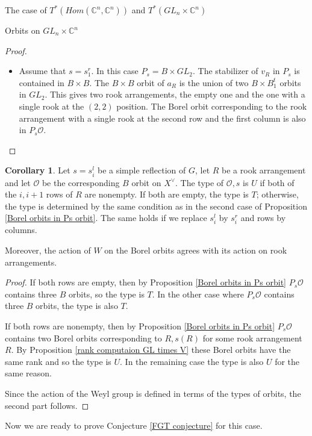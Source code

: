 \documentclass[12pt]{article}
\newcommand{\C}{\mathbb{C}}
\newcommand{\s}{\mathcal{O}}
\theoremstyle{plain}
\theoremstyle{definition}
\newtheorem{cor}[theorem]{Corollary}
\begin{document}
\begin{subsection}{The case of $T^*(Hom(\C^n,\C^n))$ and $T^*(GL_n\times \C^n)$}
\begin{subsubsection}{Orbits on $GL_n\times \C^n$}
\begin{proof}
\begin{itemize}
        \item Assume that $s=s_1^r$. In this case $P_s=B\times GL_2$. The stabilizer of $v_R$ in $P_s$ is contained in  $B\times B$. The $B\times B$ orbit of $a_R$ is the union of two $B\times B_1^t$ orbits in $GL_2$. This gives two rook arrangements, the empty one and the one with a single rook at the $(2,2)$ position. The Borel orbit corresponding to the rook arrangement with a single rook at the second row and the first column is also in $P_s\s$.
    \end{itemize}

    
    \end{proof}

    \begin{cor}\label{cor: action agrees with rooks 2}
        Let $s=s^l_i$ be a simple reflection of $G$, let $R$ be a rook arrangement and let $\s$ be the corresponding $B$ orbit on $X^\vee$. The type of $\s,s$ is $U$ if both of the $i,i+1$ rows of $R$ are nonempty. If both are empty, the type is $T$; otherwise, the type is determined by the same condition as in the second case of Proposition \ref{Borel orbits in Ps orbit}. The same holds if we replace $s^l_i$ by $s^r_i$ and rows by columns.

        Moreover, the action of $W$ on the Borel orbits agrees with its action on rook arrangements.
    \end{cor}

    \begin{proof}
        If both rows are empty, then by Proposition \ref{Borel orbits in Ps orbit} $P_s\s$ contains three $B$ orbits, so the type is $T$. In the other case where $P_s\s$ contains three $B$ orbits, the type is also $T$.

        If both rows are nonempty, then by Proposition \ref{Borel orbits in Ps orbit} $P_s\s$ contains two Borel orbits corresponding to $R,s(R)$ for some rook arrangement $R$. By Proposition \ref{rank computaion GL times V} these Borel orbits have the same rank and so the type is $U$. In the remaining case the type is also $U$ for the same reason.

        Since the action of the Weyl group is defined in terms of the types of orbits, the second part follows.
    \end{proof}

    
    \end{subsubsection}

    Now we are ready to prove Conjecture \ref{FGT conjecture} for this case.


\end{subsection}
\end{document}
